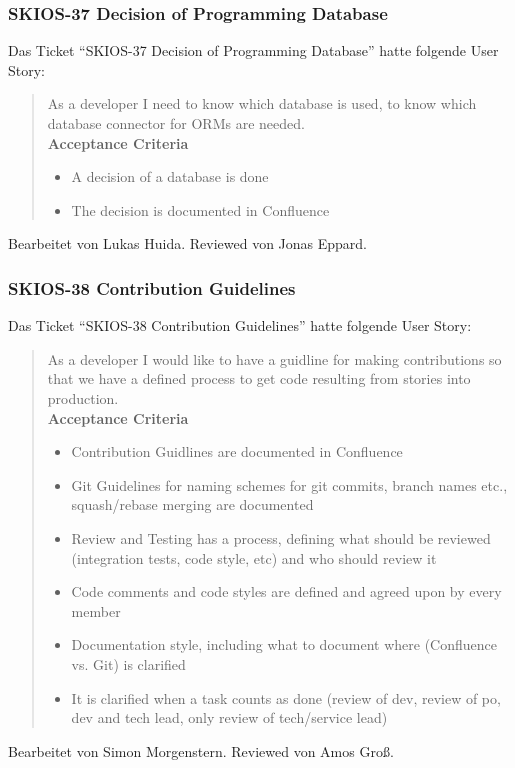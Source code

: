 \subsubsection{SKIOS-37 Decision of Programming Database}
Das Ticket \enquote{SKIOS-37 Decision of Programming Database} hatte folgende User Story:
\begin{quotation}
    As a developer I need to know which database is used, to know which database connector for ORMs are needed. \\
    \textbf{Acceptance Criteria}
    \begin{itemize}
        \item A decision of a database is done
        \item The decision is documented in Confluence
    \end{itemize}
\end{quotation}
Bearbeitet von Lukas Huida.
Reviewed von Jonas Eppard.

\subsubsection{SKIOS-38 Contribution Guidelines}
Das Ticket \enquote{SKIOS-38 Contribution Guidelines} hatte folgende User Story:
\begin{quotation}
    As a developer I would like to have a guidline for making contributions so that we have a defined process to get code resulting from stories into production. \\
\textbf{Acceptance Criteria}
\begin{itemize}
    \item Contribution Guidlines are documented in Confluence
    \item Git Guidelines for naming schemes for git commits, branch names etc., squash/rebase merging are documented
    \item Review and Testing has a process, defining what should be reviewed (integration tests, code style, etc) and who should review it
    \item Code comments and code styles are defined and agreed upon by every member
    \item Documentation style, including what to document where (Confluence vs. Git) is clarified
    \item It is clarified when a task counts as done (review of dev, review of po, dev and tech lead, only review of tech/service lead)
\end{itemize}
\end{quotation}
Bearbeitet von Simon Morgenstern.
Reviewed von Amos Groß.

